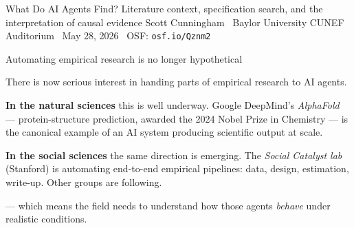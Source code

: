 \documentclass[aspectratio=169,12pt,t]{beamer}
\begin{document}

\codechellatitle
  {What Do AI Agents Find?}
  {Literature context, specification search, and the interpretation of causal evidence}
  {Scott Cunningham \textperiodcentered\ Baylor University}
  {CUNEF Auditorium \textperiodcentered\ May 28, 2026 \textperiodcentered\ OSF: \texttt{osf.io/Qznm2}}


\begin{frame}{Automating empirical research is no longer hypothetical}
\vspace{0.3cm}

There is now serious interest in handing parts of empirical research to AI agents.

\vspace{0.4cm}

\textbf{In the natural sciences} this is well underway. \;Google DeepMind's \textit{AlphaFold} \;--- protein-structure prediction, awarded the 2024 Nobel Prize in Chemistry --- is the canonical example of an AI system producing scientific output at scale.

\vspace{0.4cm}

\textbf{In the social sciences} the same direction is emerging. \;The \textit{Social Catalyst lab} (Stanford) is automating end-to-end empirical pipelines: data, design, estimation, write-up. \;Other groups are following.

\vspace{0.4cm}

 --- which means the field needs to understand how those agents \textit{behave} under realistic conditions.
\end{frame}
\end{document}
